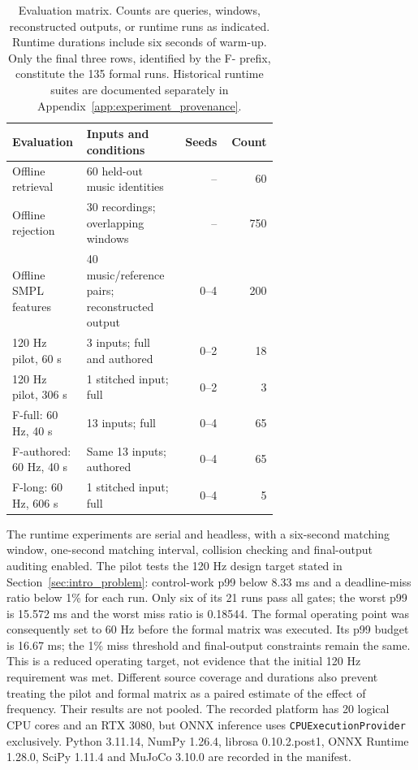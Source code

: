 \begin{table}[tb]
\centering\small
\begin{tabular}{p{0.29\linewidth}p{0.36\linewidth}rr}
\toprule
Evaluation & Inputs and conditions & Seeds & Count \\
\midrule
Offline retrieval & 60 held-out music identities & -- & 60 \\
Offline rejection & 30 recordings; overlapping windows & -- & 750 \\
Offline SMPL features & 40 music/reference pairs; reconstructed output & 0--4 & 200 \\
120 Hz pilot, 60 s & 3 inputs; full and authored & 0--2 & 18 \\
120 Hz pilot, 306 s & 1 stitched input; full & 0--2 & 3 \\
F-full: 60 Hz, 40 s & 13 inputs; full & 0--4 & 65 \\
F-authored: 60 Hz, 40 s & Same 13 inputs; authored & 0--4 & 65 \\
F-long: 60 Hz, 606 s & 1 stitched input; full & 0--4 & 5 \\
\bottomrule
\end{tabular}
\caption{Evaluation matrix. Counts are queries, windows, reconstructed outputs,
or runtime runs as indicated. Runtime durations include six seconds of warm-up.
Only the final three rows, identified by the F- prefix, constitute the 135
formal runs. Historical runtime suites are documented separately in
Appendix~\ref{app:experiment_provenance}.}
\label{tab:ch6_protocol_matrix}
\end{table}

The runtime experiments are serial and headless, with a six-second matching
window, one-second matching interval, collision checking and final-output
auditing enabled. The pilot tests the 120 Hz design target stated in
Section~\ref{sec:intro_problem}: control-work p99 below 8.33 ms and a
deadline-miss ratio below 1\% for each run. Only six of its 21 runs pass all
gates; the worst p99 is 15.572 ms and the worst miss ratio is 0.18544.
The formal operating point was consequently set to 60 Hz before the formal
matrix was executed. Its p99 budget is 16.67 ms; the 1\% miss threshold and
final-output constraints remain the same. This is a reduced operating target,
not evidence that the initial 120 Hz requirement was met. Different source
coverage and durations also prevent treating the pilot and formal matrix as
a paired estimate of the effect of frequency. Their results are not pooled.
The recorded
platform has 20 logical CPU cores and an RTX 3080,
but ONNX inference uses \texttt{CPUExecutionProvider} exclusively. Python 3.11.14,
NumPy 1.26.4, librosa 0.10.2.post1, ONNX Runtime 1.28.0, SciPy 1.11.4 and MuJoCo
3.10.0 are recorded in the manifest.

